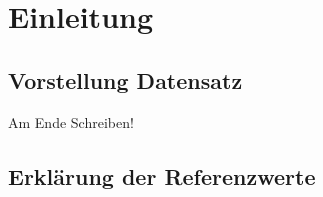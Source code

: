 \documentclass{report}
\begin{document}
\chapter{Einleitung}
\section{Vorstellung Datensatz}
Am Ende Schreiben!
\section{Erklärung der Referenzwerte}
\end{document}
